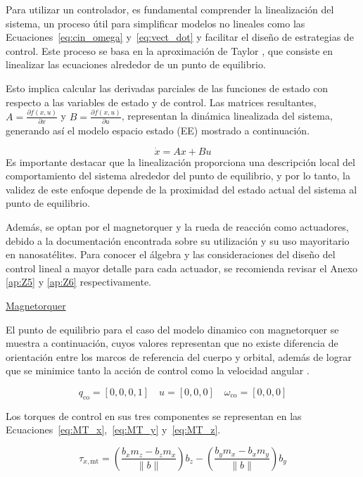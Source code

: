 Para utilizar un controlador, es fundamental comprender la linealización del sistema, un proceso útil para simplificar modelos no lineales como las Ecuaciones~\ref{eq:cin_omega} y~\ref{eq:vect_dot} y facilitar el diseño de estrategias de control. Este proceso se basa en la aproximación de Taylor \cite{ref42}, que consiste en linealizar las ecuaciones alrededor de un punto de equilibrio.

Esto implica calcular las derivadas parciales de las funciones de estado con respecto a las variables de estado y de control. Las matrices resultantes, $A = \frac{\partial f(x,u)}{\partial x}$ y $B = \frac{\partial f(x,u)}{\partial u}$, representan la dinámica linealizada del sistema, generando así el modelo espacio estado (EE) mostrado a continuación.

\[
	\dot{x} = A x + B u
\]
Es importante destacar que la linealización proporciona una descripción local del comportamiento del sistema alrededor del punto de equilibrio, y por lo tanto, la validez de este enfoque depende de la proximidad del estado actual del sistema al punto de equilibrio.

Además, se optan por el magnetorquer\cite{ref14} y la rueda de reacción\cite{ref41} como actuadores, debido a la documentación encontrada sobre su utilización y su uso mayoritario en nanosatélites. Para conocer el álgebra y las consideraciones del diseño del control lineal a mayor detalle para cada actuador, se recomienda revisar el Anexo \ref{ap:Z5} y \ref{ap:Z6} respectivamente. 

\underline{Magnetorquer}

El punto de equilibrio para el caso del modelo dinamico con magnetorquer se muestra a continuación, cuyos valores representan que no existe diferencia de orientación entre los marcos de referencia del cuerpo y orbital, además de lograr que se minimice tanto la acción de control como la velocidad angular \cite{ref14}.

\[
	q_{\text{co}} = [0, 0, 0, 1] \quad	u = [0, 0, 0] \quad	\omega_{\text{co}} = [0, 0, 0]
\]



Los torques de control en sus tres componentes se representan en las Ecuaciones~\ref{eq:MT_x},~\ref{eq:MT_y} y~\ref{eq:MT_z}.


\begin{equation}
	\tau_{x,\text{mt}} = \left( \frac{b_x m_z - b_z m_x}{\|b\|} \right) b_z - \left( \frac{b_y m_x - b_x m_y}{\|b\|} \right) b_y
	\label{eq:MT_x}
\end{equation}

